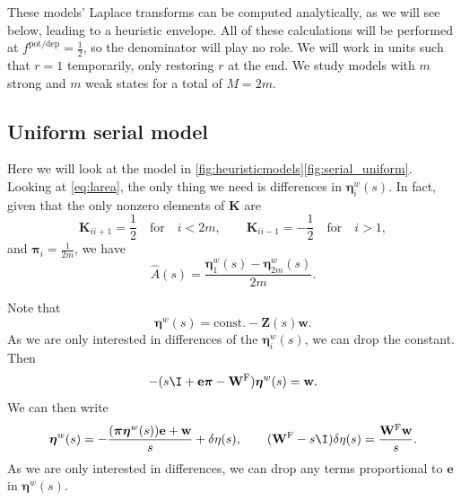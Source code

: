 \documentclass[12pt]{article}
\newcommand{\onev}{\mathbf{e}}
\newcommand{\eq}{\pib}
\newcommand{\fund}{\mathbf{Z}}
\newcommand{\pib}{\boldsymbol{\pi}}
\newcommand{\etw}{\boldsymbol{\eta}^w}
\newcommand{\w}{\mathbf{w}}
\newcommand{\W}{\mathbf{W}}
\newcommand{\enc}{\mathbf{K}}
\newcommand{\frg}{\W^{\mathrm{F}}}
\newcommand{\potdep}{^{\text{pot/dep}}}
\begin{document}
These models' Laplace transforms can be computed analytically, as we will see below, leading to a heuristic envelope.
All of these calculations will be performed at $f\potdep=\frac{1}{2}$, so the denominator will play no role.
We will work in units such that $r=1$ temporarily, only restoring $r$ at the end.
We study models with \(m\) strong and \(m\) weak states for a total of  \(M = 2 m\).


\subsection{Uniform serial model}\label{sec:serial_uniform}


Here we will look at the model in \autoref{fig:heuristicmodels}\ref{fig:serial_uniform}.
Looking at \eqref{eq:larea}, the only thing we need is differences in $\etw_i(s)$.
In fact, given that the only nonzero elements of $\enc$ are
%
\begin{equation}\label{eq:unienc}
  \enc_{ii+1}=\frac{1}{2} \quad\text{for}\quad i<2m,
  \qquad
  \enc_{ii-1}=-\frac{1}{2} \quad\text{for}\quad i>1,
\end{equation}
%
and $\eq_i = \frac{1}{2m}$, we have
%
\begin{equation}\label{eq:uniareaeta}
  \hat{A}(s) = \frac{\etw_1(s) - \etw_{2m}(s)}{2m}.
\end{equation}
%

Note that
%
\begin{equation}\label{eq:etafund}
  \etw(s) = \text{const.} - \fund(s)\w.
\end{equation}
%
As we are only interested in differences of the $\etw_i(s)$, we can drop the constant.
Then
%
\begin{equation}\label{eq:etarecur}
  -(s\I + \onev\pib - \frg)\etw(s) = \w.
\end{equation}
%
We can then write
%
\begin{equation}\label{eq:detarecur}
  \etw(s) = -\frac{(\pib\etw(s))\onev+\w}{s} + \delta\eta(s),
  \qquad
  (\frg-s\I)\delta\eta(s) = \frac{\frg\w}{s}.
\end{equation}
%
As we are only interested in differences, we can drop any terms proportional to $\onev$ in $\etw(s)$.
\end{document}
